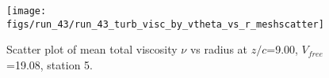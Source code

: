 \begin{figure}[H]
\centering
\texttt{[image: figs/run\_43/run\_43\_turb\_visc\_by\_vtheta\_vs\_r\_meshscatter]}
\caption{Scatter plot of mean total viscosity $\nu$ vs radius at $z/c$=9.00, $V_{free}$=19.08, station 5.}
\label{fig:run_43_turb_visc_by_vtheta_vs_r_meshscatter}
\end{figure}


